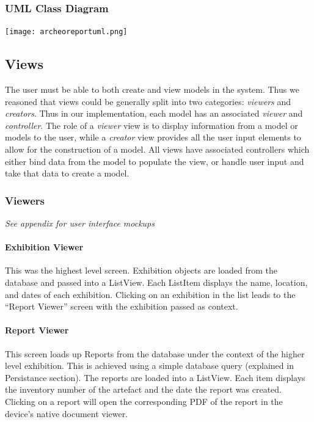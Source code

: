 \documentclass[12pt]{article}
\begin{document}
\subsubsection{UML Class Diagram}

  \texttt{[image: archeoreportuml.png]}

\subsection{Views}
The user must be able to both create and view models in the system. Thus we reasoned that views could be generally split into two categories: \textit{viewers} and \textit{creators}. Thus in our implementation, each model has an associated \textit{viewer} and \textit{controller}. The role of a  \textit{viewer} view is to display information from a model or models to the user, while a \textit{creator} view provides all the user input elements to allow for the construction of a model. All views have associated controllers which either bind data from the model to populate the view, or handle user input and take that data to create a model.


\subsubsection{Viewers}
\label{sec:Viewers}
\textit{See appendix for user interface mockups}
\paragraph{Exhibition Viewer}
This was the highest level screen. Exhibition objects are loaded from the database and passed into a ListView. Each ListItem displays the name, location, and dates of each exhibition. Clicking on an exhibition in the list leads to the ``Report Viewer'' screen with the exhibition passed as context.

\paragraph{Report Viewer}
This screen loads up Reports from the database under the context of the higher level exhibition. This is achieved using a simple database query (explained in Persistance section). The reports are loaded into a ListView. Each item displays the inventory number of the artefact and the date the report was created. Clicking on a report will open the corresponding PDF of the report in the device's native document viewer.
\end{document}
